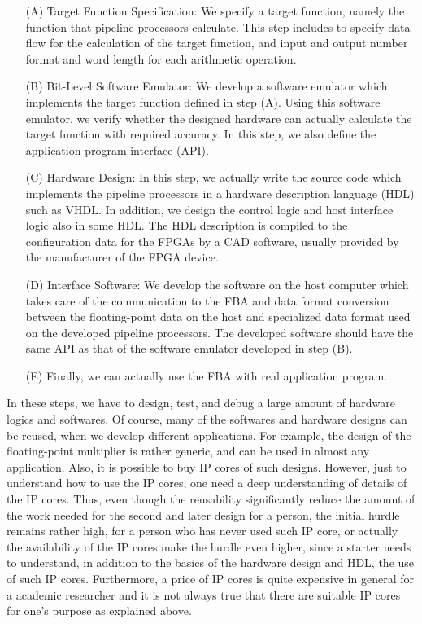 \documentclass[times, 10pt,twocolumn]{article}
\begin{document}
\begin{itemize}
\setlength{\itemsep}{6pt}

\item[(A)] Target Function Specification:
We specify a target function, namely the function that pipeline
processors calculate. This step includes to specify 
data flow for the calculation of the target function, 
and input and output number format and word length for each arithmetic operation. 

\item[(B)] Bit-Level Software Emulator:
We develop a software emulator which implements the target function
defined in step (A). Using this software emulator, we verify
whether the designed hardware can actually calculate the target
function with required accuracy. In this step, we also define the
application program interface (API). 

\item[(C)]  Hardware Design:
In this step, we actually write the source code which implements the
pipeline processors in a hardware description language (HDL) such as VHDL.
In addition, we design the control logic and host interface logic also
in some HDL. The HDL description is compiled to the configuration data
for the FPGAs by a CAD software, usually provided by the
manufacturer of the FPGA device.

\item[(D)] Interface Software:
We develop the software on the host computer which takes care of the
communication to the FBA and data format conversion between the
floating-point data on the host and specialized data format used on
the developed pipeline processors. The developed software should have
the same API as that of the software emulator developed in step (B).

\item[(E)] Finally, we can actually use the FBA with
real application program.
\end{itemize}

In these steps, we have to design, test, and debug a large amount of hardware logics
and softwares. Of course, many of the softwares and hardware designs can
be reused, when we develop different applications. For example, the
design of the floating-point multiplier is rather generic, and can be
used in almost any application. Also, it is possible to buy 
IP cores of such designs.
However, just to understand how to use the IP cores, one need a deep understanding
of details of the IP cores. Thus, even
though the reusability significantly reduce the amount of the work
needed for the second and later design for a person, the initial
hurdle remains rather high, for a person who has never used 
such IP core, or actually the availability of the IP cores make the hurdle
even higher, since a starter needs to understand, in addition to the
basics of the hardware design and HDL, the use of such IP cores.
Furthermore, a price of IP cores is quite expensive in general for a academic 
researcher and it is not always true that there are suitable IP cores
for one's purpose as explained above.
\end{document}
